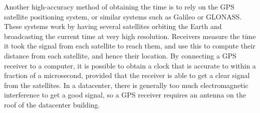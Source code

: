 Another high-accuracy method of obtaining the time is to rely on the GPS satellite positioning system, or similar systems such as Galileo or GLONASS.
These systems work by having several satellites orbiting the Earth and broadcasting the current time at very high resolution.
Receivers measure the time it took the signal from each satellite to reach them, and use this to compute their distance from each satellite, and hence their location.
By connecting a GPS receiver to a computer, it is possible to obtain a clock that is accurate to within a fraction of a microsecond, provided that the receiver is able to get a clear signal from the satellites.
In a datacenter, there is generally too much electromagnetic interference to get a good signal, so a GPS receiver requires an antenna on the roof of the datacenter building.

